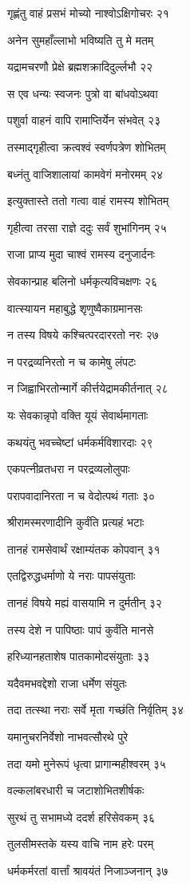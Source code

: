 गृह्णंतु वाहं प्रसभं मोच्यो नाश्वोऽक्षिगोचरः २१

अनेन सुमहाँल्लाभो भविष्यति तु मे मतम्

यद्रामचरणौ प्रेक्षे ब्रह्मशक्रादिदुर्ल्लभौ २२

स एव धन्यः स्वजनः पुत्रो वा बांधवोऽथवा

पशुर्वा वाहनं वापि रामाप्तिर्येन संभवेत् २३

तस्माद्गृहीत्वा क्रत्वश्वं स्वर्णपत्रेण शोभितम्

बध्नंतु वाजिशालायां कामवेगं मनोरमम् २४

इत्युक्तास्ते ततो गत्वा वाहं रामस्य शोभितम्

गृहीत्वा तरसा राज्ञे ददुः सर्वं शुभांगिनम् २५

राजा प्राप्य मुदा चाश्वं रामस्य दनुजार्दनः

सेवकान्प्राह बलिनो धर्मकृत्यविचक्षणः २६

वात्स्यायन महाबुद्धे शृणुष्वैकाग्रमानसः

न तस्य विषये कश्चित्परदाररतो नरः २७

न परद्रव्यनिरतो न च कामेषु लंपटः

न जिह्वाभिरतोन्मार्गे कीर्त्तयेद्रामकीर्तनात् २८

यः सेवकान्नृपो वक्ति यूयं सेवार्थमागताः

कथयंतु भवच्चेष्टां धर्मकर्मविशारदाः २९

एकपत्नीव्रतधरा न परद्रव्यलोलुपाः

परापवादानिरता न च वेदोत्पथं गताः ३०

श्रीरामस्मरणादीनि कुर्वंति प्रत्यहं भटाः

तानहं रामसेवार्थं रक्षाम्यंतक कोपवान् ३१

एतद्विरुद्धधर्माणो ये नराः पापसंयुताः

तानहं विषये मह्यं वासयामि न दुर्मतीन् ३२

तस्य देशे न पापिष्ठाः पापं कुर्वंति मानसे

हरिध्यानहताशेष पातकामोदसंयुताः ३३

यदैवमभवद्देशो राजा धर्मेण संयुतः

तदा तत्स्था नराः सर्वे मृता गच्छंति निर्वृतिम् ३४

यमानुचरनिर्वेशो नाभवत्सौरथे पुरे

तदा यमो मुनेरूपं धृत्वा प्रागान्महीश्वरम् ३५

वल्कलांबरधारी च जटाशोभितशीर्षकः

सुरथं तु सभामध्ये ददर्श हरिसेवकम् ३६

तुलसीमस्तके यस्य वाचि नाम हरेः परम्

धर्मकर्मरतां वार्त्तां श्रावयंतं निजाञ्जनान् ३७

